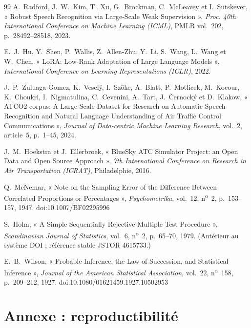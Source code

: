 \documentclass[11pt,a4paper]{article}
\begin{document}
\begin{thebibliography}{99}
 A.~Radford, J.~W.~Kim, T.~Xu, G.~Brockman, C.~McLeavey et
I.~Sutskever, « Robust Speech Recognition via Large-Scale Weak Supervision »,
\emph{Proc. 40th International Conference on Machine Learning (ICML)}, PMLR
vol.~202, p.~28492--28518, 2023.

 E.~J.~Hu, Y.~Shen, P.~Wallis, Z.~Allen-Zhu, Y.~Li, S.~Wang,
L.~Wang et W.~Chen, « LoRA: Low-Rank Adaptation of Large Language Models »,
\emph{International Conference on Learning Representations (ICLR)}, 2022.

 J.~P.~Zuluaga-Gomez, K.~Veselý, I.~Szöke, A.~Blatt,
P.~Motlicek, M.~Kocour, K.~Choukri, I.~Nigmatulina, C.~Cevenini, A.~Tart,
J.~Černocký et D.~Klakow, « ATCO2 corpus: A Large-Scale Dataset for Research
on Automatic Speech Recognition and Natural Language Understanding of Air
Traffic Control Communications », \emph{Journal of Data-centric Machine
Learning Research}, vol.~2, article~5, p.~1--45, 2024.

 J.~M.~Hoekstra et J.~Ellerbroek, « BlueSky ATC Simulator
Project: an Open Data and Open Source Approach », \emph{7th International
Conference on Research in Air Transportation (ICRAT)}, Philadelphie, 2016.

 Q.~McNemar, « Note on the Sampling Error of the Difference
Between Correlated Proportions or Percentages », \emph{Psychometrika},
vol.~12, n\textsuperscript{o}~2, p.~153--157, 1947. doi:10.1007/BF02295996

 S.~Holm, « A Simple Sequentially Rejective Multiple Test
Procedure », \emph{Scandinavian Journal of Statistics}, vol.~6,
n\textsuperscript{o}~2, p.~65--70, 1979.
(Antérieur au système DOI ; référence stable JSTOR 4615733.)

 E.~B.~Wilson, « Probable Inference, the Law of Succession,
and Statistical Inference », \emph{Journal of the American Statistical
Association}, vol.~22, n\textsuperscript{o}~158, p.~209--212, 1927.
doi:10.1080/01621459.1927.10502953

\end{thebibliography}

\section*{Annexe : reproductibilité}
\end{document}
